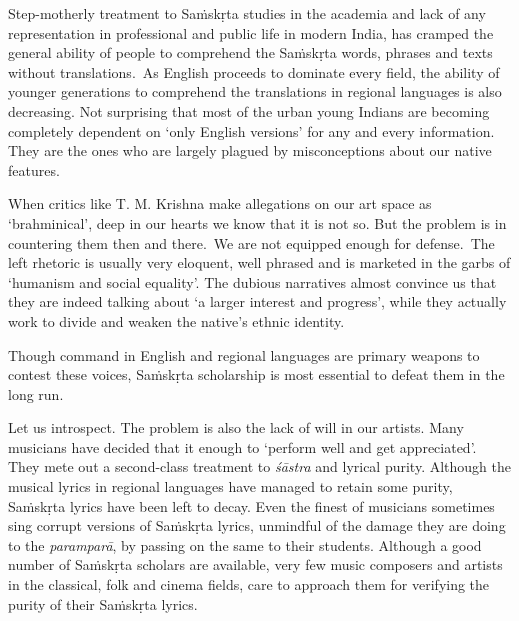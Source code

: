 Step-motherly treatment to Saṁskṛta studies in the academia and lack of any representation in professional and public life in modern India, has cramped the general ability of people to comprehend the Saṁskṛta words, phrases and texts without translations.~As English proceeds to dominate every field, the ability of younger generations to comprehend the translations in regional languages is also decreasing. Not surprising that most of the urban young Indians are becoming completely dependent on ‘only English versions’ for any and every information. They are the ones who are largely plagued by misconceptions about our native features.

When critics like T. M. Krishna make allegations on our art space as ‘brahminical’, deep in our hearts we know that it is not so. But the problem is in countering them then and there.~We are not equipped enough for defense.~The left rhetoric is usually very eloquent, well phrased and is marketed in the garbs of ‘humanism and social equality’. The dubious narratives almost convince us that they are indeed talking about ‘a larger interest and progress’, while they actually work to divide and weaken the native’s ethnic identity.

Though command in English and regional languages are primary weapons to contest these voices, Saṁskṛta scholarship is most essential to defeat them in the long run.

Let us introspect. The problem is also the lack of will in our artists. Many musicians have decided that it enough to ‘perform well and get appreciated’. They mete out a second-class treatment to \textit{śāstra} and lyrical purity. Although the musical lyrics in regional languages have managed to retain some purity, Saṁskṛta lyrics have been left to decay. Even the finest of musicians sometimes sing corrupt versions of Saṁskṛta lyrics, unmindful of the damage they are doing to the \textit{paramparā}, by passing on the same to their students. Although a good number of Saṁskṛta scholars are available, very few music composers and artists in the classical, folk and cinema fields, care to approach them for verifying the purity of their Saṁskṛta lyrics.

